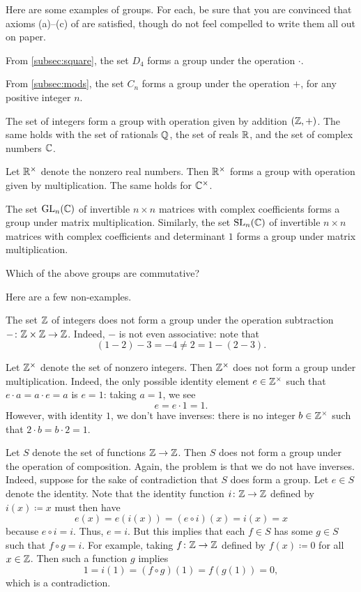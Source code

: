 \documentclass[../main.tex]{subfiles}
\begin{document}
Here are some examples of groups. For each, be sure that you are convinced that axioms (a)--(c) of  are satisfied, though do not feel compelled to write them all out on paper.
\begin{example}
    From \cref{subsec:square}, the set $D_4$ forms a group under the operation $\cdot$.
\end{example}
\begin{example}
    From \cref{subsec:mods}, the set $C_n$ forms a group under the operation $+$, for any positive integer $n$.
\end{example}
\begin{example}
    The set of integers form a group with operation given by addition $(\mathbb Z, +)$. The same holds with the set of rationals $\mathbb Q$, the set of reals $\mathbb R$, and the set of complex numbers $\mathbb C$.
\end{example}
\begin{example}
    Let $\mathbb R^{\times}$ denote the nonzero real numbers. Then $\mathbb R^\times$ forms a group with operation given by multiplication. The same holds for $\mathbb C^\times$.
\end{example}
\begin{example}
    The set $\operatorname{GL}_n(\mathbb C)$ of invertible $n\times n$ matrices with complex coefficients forms a group under matrix multiplication. Similarly, the set $\operatorname{SL}_n(\mathbb C)$ of invertible $n\times n$ matrices with complex coefficients and determinant $1$ forms a group under matrix multiplication.
\end{example}
\begin{exe}
    Which of the above groups are commutative?
\end{exe}
Here are a few non-examples.
\begin{nex}
    The set $\mathbb Z$ of integers does not form a group under the operation subtraction $-\colon\mathbb Z\times\mathbb Z\to\mathbb Z$. Indeed, $-$ is not even associative: note that
    \[(1-2)-3=-4\ne2=1-(2-3).\]
\end{nex}
\begin{nex}
    Let $\mathbb Z^\times$ denote the set of nonzero integers. Then $\mathbb Z^\times$ does not form a group under multiplication. Indeed, the only possible identity element $e\in\mathbb Z^\times$ such that $e\cdot a=a\cdot e=a$ is $e=1$: taking $a=1$, we see
    \[e=e\cdot1=1.\]
    However, with identity $1$, we don't have inverses: there is no integer $b\in\mathbb Z^\times$ such that $2\cdot b=b\cdot 2=1$.
\end{nex}
\begin{nex}
    Let $S$ denote the set of functions $\mathbb Z\to\mathbb Z$. Then $S$ does not form a group under the operation of composition. Again, the problem is that we do not have inverses. Indeed, suppose for the sake of contradiction that $S$ does form a group. Let $e\in S$ denote the identity. Note that the identity function $i\colon\mathbb Z\to\mathbb Z$ defined by $i(x)\coloneqq x$ must then have
    \[e(x)=e(i(x))=(e\circ i)(x)=i(x)=x\]
    because $e\circ i=i$. Thus, $e=i$. But this implies that each $f\in S$ has some $g\in S$ such that $f\circ g=i$. For example, taking $f\colon\mathbb Z\to\mathbb Z$ defined by $f(x)\coloneqq0$ for all $x\in\mathbb Z$. Then such a function $g$ implies
    \[1=i(1)=(f\circ g)(1)=f(g(1))=0,\]
    which is a contradiction.
\end{nex}
\end{document}
